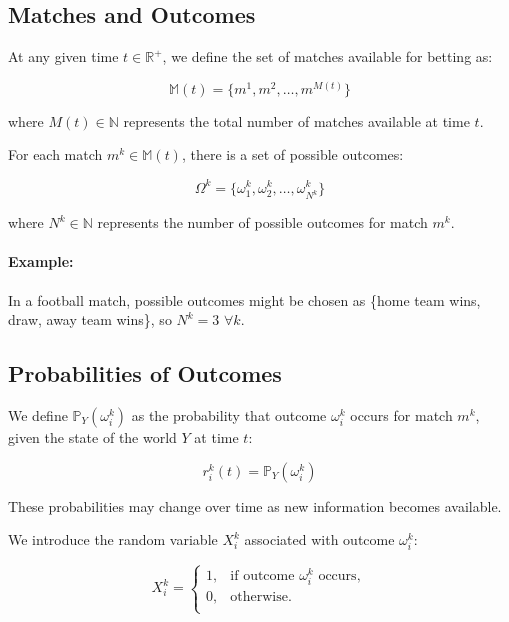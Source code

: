 \appendix


\printbibliography[heading=bibintoc,title={References}]


\subsection{Matches and Outcomes}

At any given time \( t \in \mathbb{R}^+ \), we define the set of matches available for betting as:

\[
\mathbb{M}(t) = \{ m^1, m^2, \dots, m^{M(t)} \}
\]

where \( M(t) \in \mathbb{N} \) represents the total number of matches available at time \( t \).

For each match \( m^k \in \mathbb{M}(t) \), there is a set of possible outcomes:

\[
\Omega^k = \{ \omega_1^k, \omega_2^k, \dots, \omega_{N^k}^k \}
\]

where \( N^k \in \mathbb{N} \) represents the number of possible outcomes for match \( m^k \).

\paragraph{Example:} 
In a football match, possible outcomes might be chosen as \{home team wins, draw, away team wins\}, so \( N^k = 3\) \(\forall k\).

\subsection{Probabilities of Outcomes}

We define \( \mathbb{P}_Y( \omega_i^k ) \) as the probability that outcome \( \omega_i^k \) occurs for match \( m^k \), given the state of the world \( Y \) at time \( t \):

\[
r_i^k(t) = \mathbb{P}_Y( \omega_i^k )
\]

These probabilities may change over time as new information becomes available.

We introduce the random variable \( X_i^k \) associated with outcome \( \omega_i^k \):

\[
X_i^k = \begin{cases}
1, & \text{if outcome } \omega_i^k \text{ occurs}, \\
0, & \text{otherwise}.\\
\end{cases}
\]

